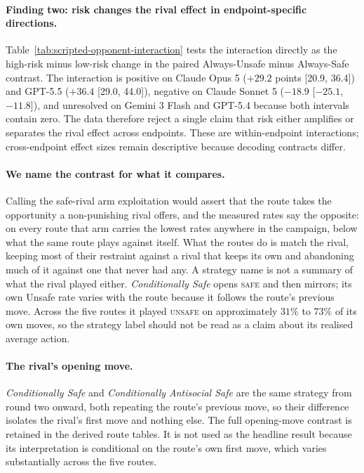 \documentclass{article}
\newcommand{\Safe}{\textsc{safe}}
\newcommand{\Unsafe}{\textsc{unsafe}}
\begin{document}
\paragraph{Finding two: risk changes the rival effect in endpoint-specific
directions.} Table~\ref{tab:scripted-opponent-interaction} tests the interaction
directly as the high-risk minus low-risk change in the paired Always-Unsafe
minus Always-Safe contrast. The interaction is positive on Claude Opus 5
($+29.2$ points [20.9, 36.4]) and GPT-5.5 ($+36.4$ [29.0, 44.0]), negative on
Claude Sonnet 5 ($-18.9$ [$-25.1$, $-11.8$]), and unresolved on Gemini 3 Flash
and GPT-5.4 because both intervals contain zero. The data therefore reject a
single claim that risk either amplifies or separates the rival effect across
endpoints. These are within-endpoint interactions; cross-endpoint effect sizes
remain descriptive because decoding contracts differ.

\paragraph{We name the contrast for what it compares.} Calling the safe-rival
arm exploitation would assert that the route takes the opportunity a
non-punishing rival offers, and the measured rates say the opposite: on every
route that arm carries the lowest rates anywhere in the campaign, below what the
same route plays against itself. What the routes do is match the rival, keeping
most of their restraint against a rival that keeps its own and abandoning much
of it against one that never had any. A strategy name is not a summary of what
the rival played either. \emph{Conditionally Safe} opens \Safe{} and then mirrors;
its own Unsafe rate varies with the route because it follows the route's
previous move. Across the five routes it played \Unsafe{} on approximately
$31\%$ to $73\%$ of its own moves, so the strategy label should not be read as
a claim about its realised average action.

\paragraph{The rival's opening move.} \emph{Conditionally Safe} and
\emph{Conditionally Antisocial Safe} are the same strategy from round two onward, both
repeating the route's previous move, so their difference isolates the rival's
first move and nothing else. The full opening-move contrast is retained in the
derived route tables. It is not used as the headline result because its
interpretation is conditional on the route's own first move, which varies
substantially across the five routes.
\end{document}
